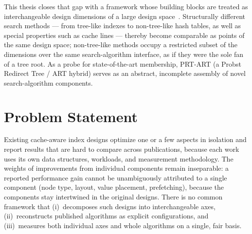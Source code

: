This thesis closes that gap with a framework whose building blocks are treated as interchangeable
design dimensions of a large design space~\cite{idreos2018periodic, idreos2018datacalculator}.
Structurally different search methods --- from tree-like indexes to non-tree-like hash tables, as
well as special properties such as cache lines --- thereby become comparable as points of the same
design space; non-tree-like methods occupy a restricted subset of the dimensions over the same
search-algorithm interface, as if they were the sole fan of a tree root. As a probe for
state-of-the-art membership, PRT-ART (a Probst Redirect Tree / ART hybrid) serves as an abstract,
incomplete assembly of novel search-algorithm components.

\section{Problem Statement}\label{sec:problem}

Existing cache-aware index designs optimize one or a few aspects in isolation and report results
that are hard to compare across publications, because each work uses its own data structures,
workloads, and measurement methodology. The weights of improvements from individual components
remain inseparable: a reported performance gain cannot be unambiguously attributed to a single
component (node type, layout, value placement, prefetching), because the components stay intertwined
in the original designs. There is no common framework that (i)~decomposes such designs into
interchangeable axes, (ii)~reconstructs published algorithms as explicit configurations, and
(iii)~measures both individual axes and whole algorithms on a single, fair basis.

